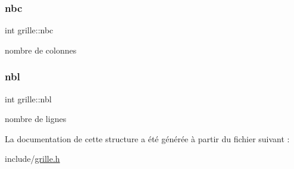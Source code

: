 \subsubsection{\texorpdfstring{nbc}{nbc}}
{\footnotesize\ttfamily int grille\+::nbc}

nombre de colonnes \mbox{\label{structgrille_a0b4da1e205825df205b0c004d105d62a}} 
\subsubsection{\texorpdfstring{nbl}{nbl}}
{\footnotesize\ttfamily int grille\+::nbl}

nombre de lignes 

La documentation de cette structure a été générée à partir du fichier suivant \+:\begin{DoxyCompactItemize}
\item 
include/\hyperlink{grille_8h}{grille.\+h}\end{DoxyCompactItemize}
